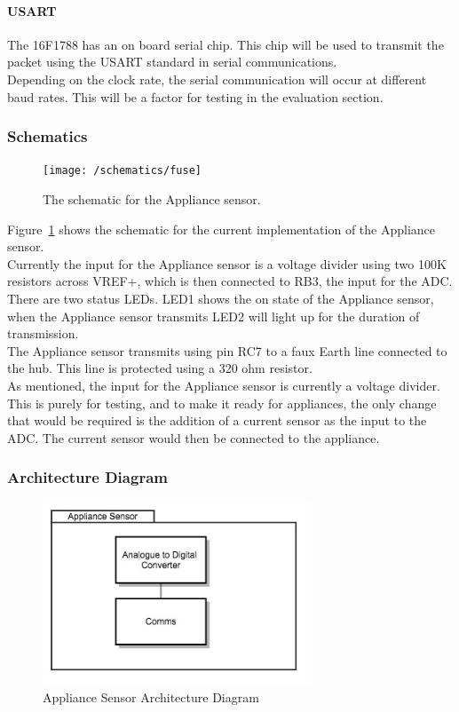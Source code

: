 \documentclass[preprint,12pt,3p]{elsarticle}
\begin{document}
\paragraph{USART}
The 16F1788 has an on board serial chip. This chip will be used to transmit the packet using the USART standard in serial communications.\\
Depending on the clock rate, the serial communication will occur at different baud rates. This will be a factor for testing in the evaluation section.

\subsubsection{Schematics}
\begin{figure}[H]
    \centering
    \texttt{[image: /schematics/fuse]}
    \caption{The schematic for the Appliance sensor.}
    \label{fig:fuseschematic}
\end{figure}
Figure~\ref{fig:fuseschematic} shows the schematic for the current implementation of the Appliance sensor.\\
Currently the input for the Appliance sensor is a voltage divider using two 100K resistors across VREF+, which is then connected to RB3, the input for the ADC.\\
There are two status LEDs. LED1 shows the on state of the Appliance sensor, when the Appliance sensor transmits LED2 will light up for the duration of transmission.\\
The Appliance sensor transmits using pin RC7 to a faux Earth line connected to the hub. This line is protected using a 320 ohm resistor.\\
As mentioned, the input for the Appliance sensor is currently a voltage divider. This is purely for testing, and to make it ready for appliances, the only change that would be required is the addition of a current sensor as the input to the ADC. The current sensor would then be connected to the appliance.

\subsubsection{Architecture Diagram}

\begin{figure}[H]
    \centering
    \includegraphics[width=8cm]{diagrams/fuse}
    \caption {Appliance Sensor Architecture Diagram}
\end{figure}
\end{document}
